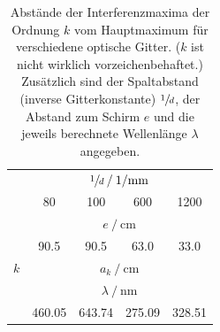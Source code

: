 \begin{table}
  \centering
  \caption{
    Abstände der Interferenzmaxima der Ordnung $k$ vom Hauptmaximum für verschiedene optische Gitter.
    ($k$ ist nicht wirklich vorzeichenbehaftet.)
    Zusätzlich sind der Spaltabstand (inverse Gitterkonstante) $\sfrac{1}{d}$, der Abstand zum Schirm $e$ und die jeweils berechnete Wellenlänge $\lambda$ angegeben.
  }
  \label{tab:mess_wellenlaenge}
  \begin{tabular}{S S S S S}
  \toprule
  &  \\
  \cmidrule(lr){2-5}
  & 80 & 100 & 600 & 1200 \\
  \midrule

  &  \\
  \cmidrule(lr){2-5}
  & 90.5 & 90.5 & 63.0 & 33.0 \\
  \midrule

  {$k$} &
   \\
  \midrule

  \midrule

  &  \\
  \cmidrule(lr){2-5}
  & 460.05  & 643.74  & 275.09  & 328.51  \\
  \bottomrule
  \end{tabular}
\end{table}
